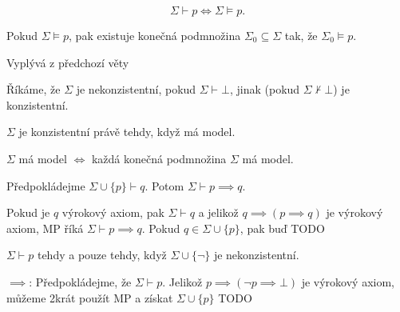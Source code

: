 \documentclass[12pt]{article}                   %
\begin{document}
    \begin{veta}
        $$ \Sigma \vdash p \Leftrightarrow \Sigma \models p. $$ 
    \end{veta}

    \begin{veta}
        Pokud $\Sigma \models p$, pak existuje konečná podmnožina $\Sigma_0 \subseteq \Sigma$ tak, že $\Sigma_0 \models p$.

        \begin{dukazin}
            Vyplývá z předchozí věty
        \end{dukazin}
    \end{veta}

    \begin{definice}[Konzistentnost]
        Říkáme, že $\Sigma$ je nekonzistentní, pokud $\Sigma \vdash \bot$, jinak (pokud $\Sigma \not\vdash \bot$) je konzistentní.
    \end{definice}

    \begin{veta}
        $\Sigma$ je konzistentní právě tehdy, když má model.
    \end{veta}

    \begin{dusledek}
        $\Sigma$ má model $\Leftrightarrow$ každá konečná podmnožina $\Sigma$ má model.
    \end{dusledek}

    \begin{lemma}[Dedukce]
        Předpokládejme $\Sigma \cup \{p\} \vdash q$. Potom $\Sigma \vdash p \implies q$.

        \begin{dukazin}[Indukcí]
            Pokud je $q$ výrokový axiom, pak $\Sigma \vdash q$ a jelikož $q \implies (p \implies q)$ je výrokový axiom, MP říká $\Sigma \vdash p \implies q$. Pokud $q \in \Sigma \cup \{p\}$, pak buď TODO
        \end{dukazin}
    \end{lemma}

    \begin{dusledek}
        $\Sigma \vdash p$ tehdy a pouze tehdy, když $\Sigma \cup \{\neg\}$ je nekonzistentní.

        \begin{dukazin}
            $\implies$: Předpokládejme, že $\Sigma \vdash p$. Jelikož $p \implies (\neg p \implies \bot)$ je výrokový axiom, můžeme 2krát použít MP a získat $\Sigma \cup \{p\}$ TODO
        \end{dukazin}
    \end{dusledek}
\end{document}
